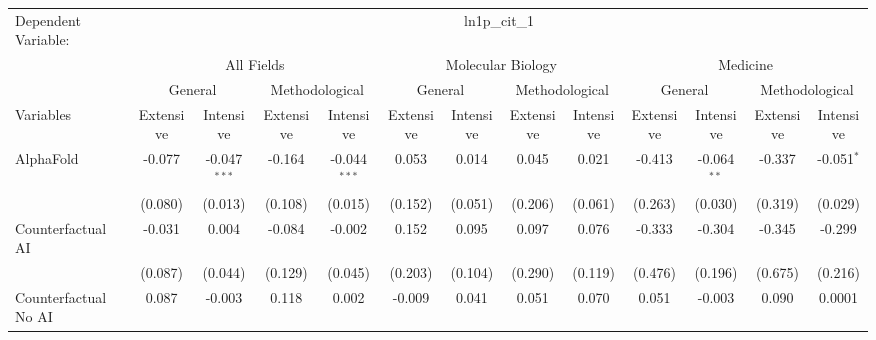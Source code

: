 \begingroup
\centering
\begin{tabular}{lcccccccccccc}
   \tabularnewline \midrule \midrule
   Dependent Variable: & \multicolumn{12}{c}{ln1p\_cit\_1}\\
 & \multicolumn{4}{c}{All Fields} & \multicolumn{4}{c}{Molecular Biology} & \multicolumn{4}{c}{Medicine} \\
\cmidrule(lr){2-5} \cmidrule(lr){6-9} \cmidrule(lr){10-13}
 & \multicolumn{2}{c}{General} & \multicolumn{2}{c}{Methodological} & \multicolumn{2}{c}{General} & \multicolumn{2}{c}{Methodological} & \multicolumn{2}{c}{General} & \multicolumn{2}{c}{Methodological} \\
\cmidrule(lr){2-3} \cmidrule(lr){4-5} \cmidrule(lr){6-7} \cmidrule(lr){8-9} \cmidrule(lr){10-11} \cmidrule(lr){12-13}
Variables & \multicolumn{1}{c}{Extensive} & \multicolumn{1}{c}{Intensive} & \multicolumn{1}{c}{Extensive} & \multicolumn{1}{c}{Intensive} & \multicolumn{1}{c}{Extensive} & \multicolumn{1}{c}{Intensive} & \multicolumn{1}{c}{Extensive} & \multicolumn{1}{c}{Intensive} & \multicolumn{1}{c}{Extensive} & \multicolumn{1}{c}{Intensive} & \multicolumn{1}{c}{Extensive} & \multicolumn{1}{c}{Intensive} \\
\cmidrule(lr){1-1}\cmidrule(lr){2-2} \cmidrule(lr){3-3} \cmidrule(lr){4-4} \cmidrule(lr){5-5} \cmidrule(lr){6-6} \cmidrule(lr){7-7} \cmidrule(lr){8-8} \cmidrule(lr){9-9} \cmidrule(lr){10-10} \cmidrule(lr){11-11} \cmidrule(lr){12-12} \cmidrule(lr){13-13}
   AlphaFold                                & -0.077  & -0.047$^{***}$ & -0.164  & -0.044$^{***}$ & 0.053   & 0.014         & 0.045   & 0.021        & -0.413  & -0.064$^{**}$ & -0.337  & -0.051$^{*}$\\   
                                            & (0.080) & (0.013)        & (0.108) & (0.015)        & (0.152) & (0.051)       & (0.206) & (0.061)      & (0.263) & (0.030)       & (0.319) & (0.029)\\   
   Counterfactual AI                        & -0.031  & 0.004          & -0.084  & -0.002         & 0.152   & 0.095         & 0.097   & 0.076        & -0.333  & -0.304        & -0.345  & -0.299\\   
                                            & (0.087) & (0.044)        & (0.129) & (0.045)        & (0.203) & (0.104)       & (0.290) & (0.119)      & (0.476) & (0.196)       & (0.675) & (0.216)\\   
   Counterfactual No AI                     & 0.087   & -0.003         & 0.118   & 0.002          & -0.009  & 0.041         & 0.051   & 0.070        & 0.051   & -0.003        & 0.090   & 0.0001\\   

\end{tabular}
